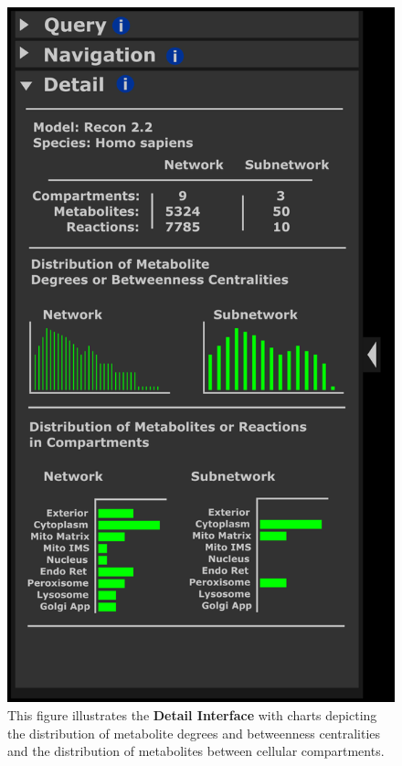 \begin{figure}[htbp]
\includegraphics[scale=1]{sketch_2017-01-02_3}
\centering
\caption{This figure illustrates the \textbf{Detail Interface} with charts depicting the distribution of metabolite degrees and betweenness centralities and the distribution of metabolites between cellular compartments.}
\label{fig:2017-01-02_3}
\end{figure}

